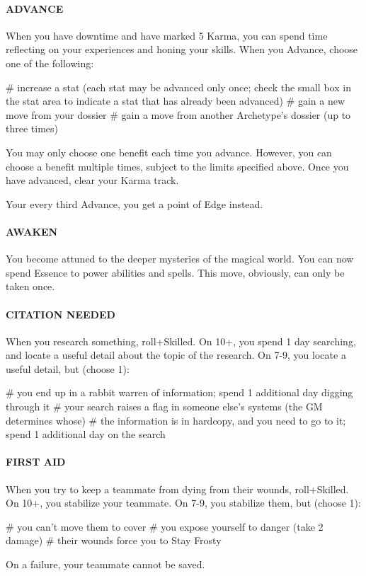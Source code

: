 \paragraph{ADVANCE}
When you have downtime and have marked 5 Karma, you can spend time reflecting on your experiences and honing your skills. When you Advance, choose one of the following:
\begin{easylist}
    # increase a stat (each stat may be advanced only once; check the small box in the stat area to indicate a stat that has already been advanced)
    # gain a new move from your dossier
    # gain a move from another Archetype’s dossier (up to three times)
\end{easylist}
You may only choose one benefit each time you advance. However, you can choose a benefit multiple times, subject to the limits specified above. Once you have advanced, clear your Karma track.

Your every third Advance, you get a point of Edge instead.

\paragraph{AWAKEN}
You become attuned to the deeper mysteries of the magical world. You can now spend Essence to power abilities and spells. This move, obviously, can only be taken once.

\paragraph{CITATION NEEDED}
When you research something, roll+Skilled. On 10+, you spend 1 day searching, and locate a useful detail about the topic of the research. On 7-9, you locate a useful detail, but (choose 1):

\begin{easylist}
    # you end up in a rabbit warren of information; spend 1 additional day digging through it
    # your search raises a flag in someone else’s systems (the GM determines whose)
    # the information is in hardcopy, and you need to go to it; spend 1 additional day on the search
\end{easylist}

\paragraph{FIRST AID}
When you try to keep a teammate from dying from their wounds, roll+Skilled. On 10+, you stabilize your teammate. On 7-9, you stabilize them, but (choose 1):
\begin{easylist}
    # you can’t move them to cover
    # you expose yourself to danger (take 2 damage)
    # their wounds force you to Stay Frosty
\end{easylist}
On a failure, your teammate cannot be saved.


